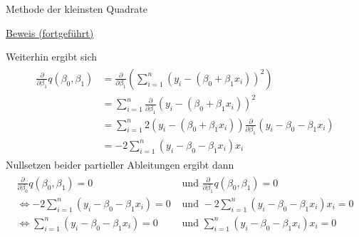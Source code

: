 \documentclass[
  8pt,
  ignorenonframetext,
]{beamer}
\begin{document}
\begin{frame}{Methode der kleinsten Quadrate}
\protect\hypertarget{methode-der-kleinsten-quadrate-8}{}
\tiny
\setlength{\abovedisplayskip}{3pt}
\setlength{\belowdisplayskip}{3pt}
\vspace{3mm}

\underline{Beweis (fortgeführt)}

Weiterhin ergibt sich \vspace{-2mm} \begin{align}
\begin{split}
\frac{\partial}{\partial \beta_1} q(\beta_0,\beta_1)
& = \frac{\partial}{\partial \beta_1}\left(\sum_{i=1}^n \left(y_i - (\beta_0 + \beta_1 x_i)\right)^2\right) \\[-5pt]
& = \sum_{i=1}^n \frac{\partial}{\partial \beta_1} \left(y_i - (\beta_0 + \beta_1 x_i)\right)^2 \\[-5pt]
& = \sum_{i=1}^n 2\left(y_i - (\beta_0 + \beta_1 x_i)\right)\frac{\partial}{\partial \beta_1}\left(y_i - \beta_0 - \beta_1 x_i \right) \\[-5pt]
& = -2\sum_{i=1}^n \left(y_i - \beta_0  - \beta_1 x_i\right)x_i
\end{split}
\end{align} Nullsetzen beider partieller Ableitungen ergibt dann
\begin{align}
\begin{split}
\frac{\partial}{\partial \beta_0} q(\beta_0,\beta_1)  = 0       & \mbox{ und }
\frac{\partial}{\partial \beta_1} q(\beta_0,\beta_1)  = 0
\\[-5pt]
\Leftrightarrow
-2\sum_{i=1}^n \left(y_i - \beta_0  - \beta_1 x_i\right)    = 0 & \mbox{ und }
-2\sum_{i=1}^n \left(y_i - \beta_0  - \beta_1 x_i\right)x_i = 0
\\[-5pt]
\Leftrightarrow
\sum_{i=1}^n \left(y_i - \beta_0  - \beta_1 x_i\right)       = 0 & \mbox{ und }
\sum_{i=1}^n \left(y_i - \beta_0  - \beta_1 x_i\right)x_i    = 0
\end{split}
\end{align}
\end{frame}
\end{document}
